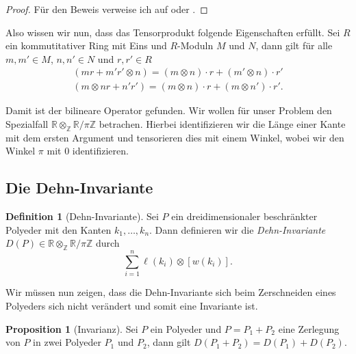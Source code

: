 \documentclass[11pt,titlepage]{article}
\newcommand{\setZ}{\mathbb{Z}}
\newcommand{\setR}{\mathbb{R}}
\theoremstyle{definition}
\newtheorem{proposition}[theorem]{Proposition}
\newtheorem{definition}[theorem]{Definition}
\theoremstyle{remark}
\begin{document}
	\begin{proof}
		Für den Beweis verweise ich auf \cite[Proposition 2.12]{introductiontocomalg} oder \cite[Satz 7.3]{SkriptLA}.
	\end{proof}
	
	Also wissen wir nun, dass das Tensorprodukt folgende Eigenschaften erfüllt. Sei $R$ ein kommutitativer Ring 
	mit Eins und $R$-Moduln $M$ und $N$, dann gilt für alle $m,m'\in M$, $n,n'\in N$ und $r,r'\in R$
	\begin{align*}
		(mr+m'r'\otimes n)=(m\otimes n)\cdot r +(m'\otimes n)\cdot r' \\
		(m\otimes nr+n'r')=(m\otimes n)\cdot r+(m\otimes n')\cdot r'.
	\end{align*}
	
	Damit ist der bilineare Operator gefunden. Wir wollen für unser Problem den Spezialfall 
	$\setR \otimes_{\setZ} \setR / \pi\setZ$ betrachen. Hierbei identifizieren wir die Länge einer Kante mit dem 
	ersten Argument und tensorieren dies mit einem Winkel, wobei wir den Winkel $\pi$ mit 0 identifizieren.
	
	\subsection{Die Dehn-Invariante}
	
	\begin{definition}[Dehn-Invariante]
		Sei $P$ ein dreidimensionaler beschränkter Polyeder mit den Kanten $k_1,\ldots,k_n$. Dann definieren wir die 
		\textsl{Dehn-Invariante} $D(P)\in \setR \otimes_{\setZ}\setR/\pi \setZ$ durch
		\[ \sum_{i=1}^n \ell(k_i)\otimes [w(k_i)]. \]
	\end{definition}
	
	Wir müssen nun zeigen, dass die Dehn-Invariante sich beim Zerschneiden eines Polyeders sich nicht 
	verändert und somit eine Invariante ist.
	
	\begin{proposition}[Invarianz] \label{prop:invarianz}
		Sei $P$ ein Polyeder und $P=P_1+P_2$ eine Zerlegung von $P$ in zwei Polyeder $P_1$ und $P_2$, dann 
		gilt $D(P_1+P_2)=D(P_1)+D(P_2)$.	
	\end{proposition}
	
\end{document}
